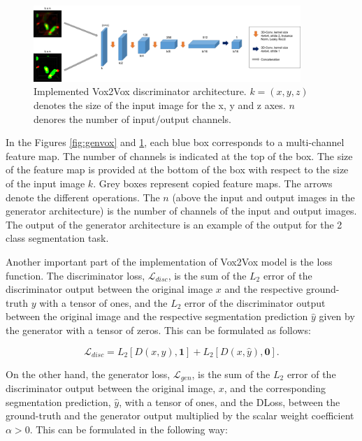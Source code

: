 \begin{figure}[!htb]
  \centering
  \includegraphics[width=0.90\textwidth]{Images/discriminator_vox.jpg}
  \caption{Implemented Vox2Vox discriminator architecture. $k=(x,y,z)$ denotes the size of the input image for the x, y and z axes. $n$ denores the number of input/output channels.}
  \label{fig:discvox}
\end{figure}

In the Figures \ref{fig:genvox} and \ref{fig:discvox}, each blue box corresponds to a multi-channel feature map. The number of channels is indicated at the top of the box. The size of the feature map is provided at the bottom of the box with respect to the size of the input image $k$. Grey boxes represent copied feature maps. The arrows denote the different operations. The $n$ (above the input and output images in the generator architecture) is the number of channels of the input and output images. The output of the generator architecture is an example of the output for the 2 class segmentation task.

Another important part of the implementation of Vox2Vox model is the loss function. The discriminator loss, $\mathcal{L}_{disc}$, is the sum of the $L_2$ error of the discriminator output between the original image $x$ and the respective ground-truth $y$ with a tensor of ones, and the $L_2$ error of the discriminator output between the original image and the respective segmentation prediction $\hat{y}$ given by the generator with a tensor of zeros. This can be formulated as follows:

\begin{equation}
    \mathcal{L}_{disc} = L_2[D(x,y),\boldsymbol{1}] + L_2[D(x,\hat{y}),\boldsymbol{0}].
\end{equation}

On the other hand, the generator loss, $\mathcal{L}_{gen}$, is the sum of the $L_2$ error of the discriminator output between the original image, $x$, and the corresponding segmentation prediction, $\hat{y}$, with a tensor of ones, and the \ac{DLoss}, between the ground-truth and the generator output multiplied by the scalar weight coefficient $\alpha > 0$. This can be formulated in the following way:

